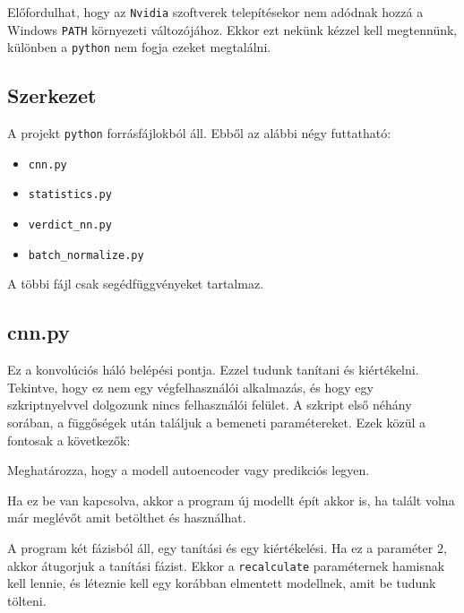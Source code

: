 Előfordulhat, hogy az \texttt{Nvidia} szoftverek telepítésekor nem adódnak hozzá a 
Windows \texttt{PATH} környezeti változójához. Ekkor ezt nekünk kézzel kell megtennünk,
különben a \texttt{python} nem fogja ezeket megtalálni.


\subsection{Szerkezet}

A projekt \texttt{python} forrásfájlokból áll. Ebből az alábbi négy futtatható:


\begin{itemize}
	\item \texttt{cnn.py}
	\item \texttt{statistics.py}
	\item \texttt{verdict\_nn.py}
	\item \texttt{batch\_normalize.py}

\end{itemize}

A többi fájl csak segédfüggvényeket tartalmaz.

\subsection{cnn.py}

Ez a konvolúciós háló belépési pontja. Ezzel tudunk tanítani és kiértékelni. Tekintve, hogy 
ez nem egy végfelhasználói alkalmazás, és hogy egy szkriptnyelvvel dolgozunk nincs 
felhasználói felület. A szkript első néhány sorában, a függőségek után találjuk a bemeneti 
paramétereket. Ezek közül a fontosak a következők:


Meghatározza, hogy a modell autoencoder vagy predikciós legyen.




Ha ez be van kapcsolva, akkor a program új modellt épít akkor is, ha talált volna 
már meglévőt amit betölthet és használhat.



A program két fázisból áll, egy tanítási és egy kiértékelési. Ha ez a paraméter
$ 2 $, akkor átugorjuk a tanítási fázist. Ekkor a \texttt{recalculate} paraméternek
hamisnak kell lennie, és léteznie kell egy korábban elmentett modellnek, amit be
tudunk tölteni.



